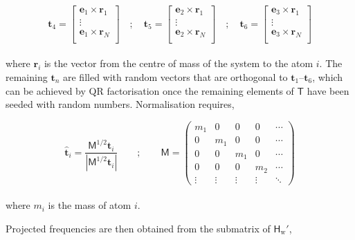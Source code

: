 \documentclass[10pt]{article}
\begin{document}
\begin{equation}
	\boldsymbol{t}_4 = \begin{bmatrix}
		\boldsymbol{e}_1 \times \boldsymbol{r}_1 \\
		\vdots \\
		\boldsymbol{e}_1 \times \boldsymbol{r}_N \\
	\end{bmatrix}
	\quad ; \quad 
	\boldsymbol{t}_5 = \begin{bmatrix}
		\boldsymbol{e}_2 \times \boldsymbol{r}_1 \\
		\vdots \\
		\boldsymbol{e}_2 \times \boldsymbol{r}_N \\
	\end{bmatrix}
	\quad ; \quad 
	\boldsymbol{t}_6 = \begin{bmatrix}
		\boldsymbol{e}_3 \times \boldsymbol{r}_1 \\
		\vdots \\
		\boldsymbol{e}_3 \times \boldsymbol{r}_N \\
	\end{bmatrix}
\end{equation}
\\
where $\boldsymbol{r}_i$ is the vector from the centre of mass of the system to the atom $i$. The remaining $\boldsymbol{t}_n$ are filled with random vectors that are orthogonal to $\boldsymbol{t}_1\text{--}\boldsymbol{t}_6$, which can be achieved by QR factorisation once the remaining elements of $\mathsf{T}$ have been seeded with random numbers. Normalisation requires,

\begin{equation}
	\hat{\boldsymbol{t}}_i = \frac{\mathsf{M}^{1/2}\boldsymbol{t}_i}{|\mathsf{M}^{1/2}\boldsymbol{t}_i|}	
	\qquad ; \qquad
	\mathsf{M} = \begin{pmatrix}
		m_1 & 0 & 0 & 0 &\cdots \\
		0 & m_1 & 0 & 0& \cdots \\
		0 & 0 & m_1 & 0& \cdots \\
		0 & 0 & 0 & m_2 & \cdots \\
		\vdots & \vdots & \vdots & \vdots & \ddots
	\end{pmatrix}
\end{equation}
\\
where $m_i$ is the mass of atom $i$.

\vspace{0.4cm}

Projected frequencies are then obtained from the submatrix of $\mathsf{H}_\text{w}'$,
\end{document}
